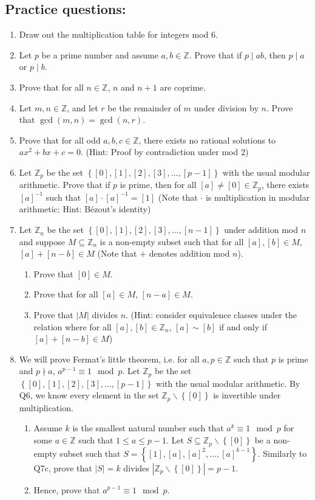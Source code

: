 \documentclass[letterpaper,12pt]{article}
\newcommand{\set}[1]{\left\{ #1 \right\}}
\begin{document}
\subsection*{Practice questions:}
\begin{enumerate}
\item Draw out the multiplication table for integers mod $6$.
\item Let $p$ be a prime number and assume $a,b \in \mathbb{Z}$. Prove that if $p \mid ab$, then $p \mid a$ or $p \mid b$.
\item Prove that for all $n \in \mathbb{Z}$, $n$ and $n+1$ are coprime.
\item Let $m,n \in \mathbb{Z}$, and let $r$ be the remainder of $m$ under division by $n$. Prove that $\gcd (m,n) = \gcd (n,r)$.
    \item Prove that for all odd $a,b,c \in \mathbb{Z}$, there exists no rational solutions to $ax^2 + bx + c = 0$. (Hint: Proof by contradiction under mod 2)
    \item Let $\mathbb{Z}_p$ be the set $\set{[0],[1],[2],[3],\ldots,[p-1]}$ with the usual modular arithmetic. Prove that if $p$ is prime, then for all $[a] \neq [0] \in \mathbb{Z}_p$, there exists $[a]^{-1}$ such that $[a] \cdot [a]^{-1} = [1]$ (Note that $\cdot$ is multiplication in modular arithmetic; Hint: Bézout's identity)
    \item Let $\mathbb{Z}_n$ be the set $\set{[0],[1],[2],[3],\ldots,[n-1]}$ under addition mod $n$ and suppose $M \subseteq \mathbb{Z}_n$ is a non-empty subset such that for all $[a],[b] \in M$, $[a] + [n-b] \in M$ (Note that $+$ denotes addition mod $n$). \begin{enumerate}
        \item Prove that $[0] \in M$.
        \item Prove that for all $[a] \in M$, $[n-a] \in M$.
        \item Prove that $|M|$ divides $n$. (Hint: consider equivalence classes under the relation where for all $[a], [b] \in \mathbb{Z}_n$, $[a] \sim [b]$ if and only if $[a] + [n-b] \in M$)
    \end{enumerate}
    \item We will prove Fermat's little theorem, i.e. for all $a ,p \in \mathbb{Z}$ such that $p$ is prime and $p \nmid a$, $a^{p-1} \equiv 1 \mod p$. Let $\mathbb{Z}_p$ be the set $\set{[0],[1],[2],[3],\ldots,[p-1]}$ with the usual modular arithmetic. By Q6, we know every element in the set $\mathbb{Z}_p \backslash \set{[0]}$ is invertible under multiplication. \begin{enumerate}
        \item Assume $k$ is the smallest natural number such that $a^k \equiv 1 \mod p$ for some $a \in \mathbb{Z}$ such that $1 \leq a \leq p-1$. Let $S \subseteq \mathbb{Z}_p \backslash \set{[0]}$ be a non-empty subset such that $S = \set{[1],[a],[a]^2, \ldots, [a]^{k-1}}$. Similarly to Q7c, prove that $|S| = k$ divides $|\mathbb{Z}_p \backslash \set{[0]}| = p-1$.
        \item Hence, prove that $a^{p-1} \equiv 1 \mod p$.
    \end{enumerate}
\end{enumerate}
\end{document}
